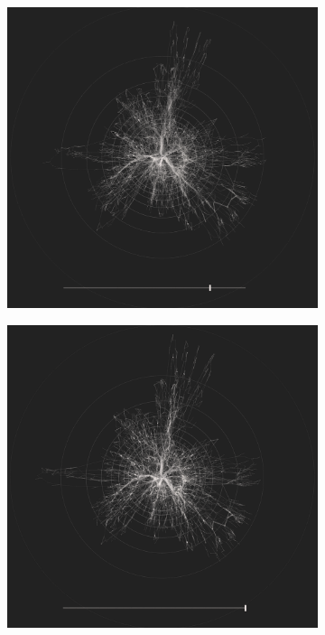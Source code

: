 \begin{figure}[H]
\begin{subfigure}[b]{.49\textwidth}
    \end{subfigure}
    \centering
     \begin{subfigure}[b]{.49\textwidth}
        \centering
    \includegraphics[width=\textwidth]{figures_c1/layout/confluent/75.png} 
    \caption{}
    \end{subfigure}
    \centering
     \begin{subfigure}[b]{.49\textwidth}
        \centering
    \includegraphics[width=\textwidth]{figures_c1/layout/confluent/100.png} 

\end{subfigure}
\end{figure}
